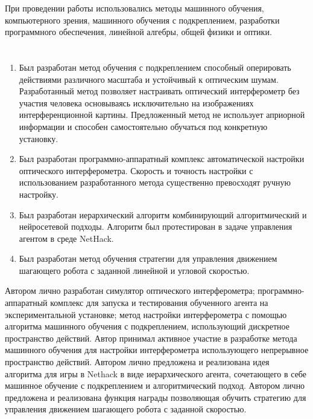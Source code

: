 {\methods} При проведении работы использовались методы машинного обучения, компьютерного зрения, машинного обучения с подкреплением, разработки программного обеспечения, линейной алгебры, общей физики и оптики. 

\ifresume
\section*{}
\fi

{}
\begin{enumerate}[beginpenalty=10000] %
  \item Был разработан метод обучения с подкреплением способный оперировать действиями различного масштаба и устойчивый к оптическим шумам. Разработанный метод позволяет настраивать оптический интерферометр без участия человека основываясь исключительно на изображениях интерференционной картины. Предложенный метод не использует априорной информации и способен самостоятельно обучаться под конкретную установку.
  \item Был разработан программно-аппаратный комплекс автоматической настройки оптического интерферометра. Скорость и точность настройки с использованием разработанного метода существенно превосходят ручную настройку. 
  \item Был разработан иерархический алгоритм комбинирующий алгоритмический и нейросетевой подходы. Алгоритм был протестирован в задаче управления агентом в среде NetHack.
  \item Был разработан метод обучения стратегии для управления движением шагающего робота с заданной линейной и угловой скоростью.
\end{enumerate}

{\contribution} Автором лично разработан симулятор оптического интерферометра; программно-аппаратный комплекс для запуска и тестирования обученного агента на экспериментальной установке; метод настройки интерферометра с помощью алгоритма машинного обучения с подкреплением, использующий дискретное пространство действий. Автор принимал активное участие в разработке метода машинного обучения для настройки интерферометра использующего непрерывное пространство действий. Автором лично предложена и реализована идея алгоритма для игры в Nethack в виде иерархического агента, сочетающего в себе машинное обучение с подкреплением и алгоритмический подход. Автором лично предложена и реализована функция награды позволяющая обучить стратегию для управления движением шагающего робота с заданной скоростью. 


